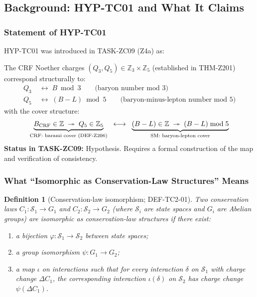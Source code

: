 \documentclass[12pt, a4paper]{article}
\newtheorem{definition}{Definition}[section]
\begin{document}
\subsection{Background: HYP-TC01 and What It Claims}
\label{sec:background}

\subsubsection{Statement of HYP-TC01}

HYP-TC01 was introduced in TASK-ZC09 (Z4a) as:

\begin{formalbox}[title={HYP-TC01 (as stated in TASK-ZC09 Z4a)}]
The CRF Noether charges $(Q_3, Q_5) \in \mathbb{Z}_3 \times \mathbb{Z}_5$
(established in THM-Z201) correspond structurally to:
\begin{align}
  Q_3 &\;\longleftrightarrow\; B \bmod 3
  \qquad\text{(baryon number mod 3)} \label{eq:hyp-Q3} \\
  Q_5 &\;\longleftrightarrow\; (B-L) \bmod 5
  \qquad\text{(baryon-minus-lepton number mod 5)} \label{eq:hyp-Q5}
\end{align}
with the cover structure:
\[
  \underbrace{B_{\rm CRF} \in \mathbb{Z} \;\twoheadrightarrow\;
  Q_5 \in \mathbb{Z}_5}_{\text{CRF: barami cover (DEF-Z206)}}
  \;\;\longleftrightarrow\;\;
  \underbrace{(B-L) \in \mathbb{Z} \;\twoheadrightarrow\;
  (B-L)\bmod 5}_{\text{SM: baryon-lepton cover}}
\]
\textbf{Status in TASK-ZC09:} Hypothesis. Requires a formal
construction of the map and verification of consistency.
\end{formalbox}

\subsubsection{What ``Isomorphic as Conservation-Law Structures'' Means}

\begin{definition}[Conservation-law isomorphism; DEF-TC2-01]
\label{def:cl-iso}
Two conservation laws $C_1: \mathcal{S}_1 \to G_1$ and
$C_2: \mathcal{S}_2 \to G_2$ (where $\mathcal{S}_i$ are state
spaces and $G_i$ are Abelian groups) are
\emph{isomorphic as conservation-law structures} if there exist:
\begin{enumerate}[leftmargin=*, label=(\roman*), noitemsep]
  \item a bijection $\varphi: \mathcal{S}_1 \to \mathcal{S}_2$
    between state spaces;
  \item a group isomorphism $\psi: G_1 \to G_2$;
  \item a map $\iota$ on interactions such that for every
    interaction $\delta$ on $\mathcal{S}_1$ with charge change
    $\Delta C_1$, the corresponding interaction $\iota(\delta)$
    on $\mathcal{S}_2$ has charge change $\psi(\Delta C_1)$.
\end{enumerate}
\end{definition}
\end{document}
